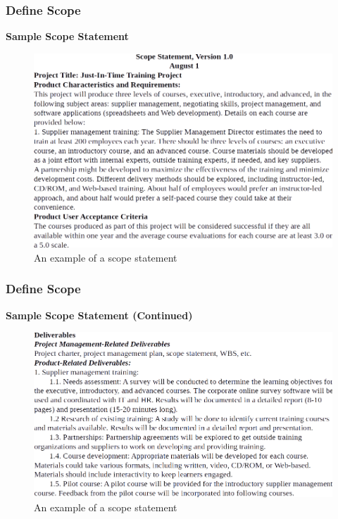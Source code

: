 \documentclass{beamer}
\begin{document}
\begin{frame}
\frametitle{Define Scope}
\textbf{Sample Scope Statement}
\begin{figure}
\includegraphics[scale=0.4]{scope_stat_1}
\vspace{-0.3cm}
\caption{An example of a scope statement}
\end{figure}
\end{frame}


\begin{frame}
\frametitle{Define Scope}
\textbf{Sample Scope Statement (Continued)}
\begin{figure}
\includegraphics[scale=0.4]{scope_stat_2}

\caption{An example of a scope statement}
\end{figure}
\end{frame}

\end{document}
